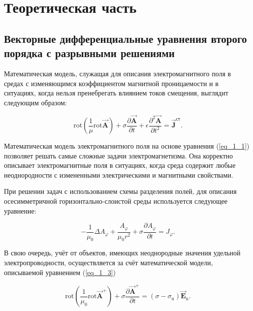 \chapter{Теоретическая часть}

\section{Векторные дифференциальные уравнения второго порядка с разрывными решениями}

Математическая модель, служащая для описания электромагнитного поля в средах с изменяющимся коэффициентом магнитной проницаемости и в ситуациях, когда нельзя пренебрегать влиянием токов смещения, выглядит следующим образом:

\begin{equation} \label{eq_1_1}
	\text{rot} \left( \frac{1}{\mu} \text{rot} \overrightarrow{\textbf{A}} \right) + \sigma \frac{\partial \overrightarrow{\textbf{A}}}{\partial t} + \epsilon \frac{\partial^2 \overrightarrow{\textbf{A}}}{\partial t^2} = \overrightarrow{\textbf{J}}^{\textbf{ст}}.
\end{equation}

Математическая модель электромагнитного поля на основе уравнения (\ref{eq_1_1}) позволяет решать самые сложные задачи электромагнетизма. Она корректно описывает электромагнитные поля в ситуациях, когда среда содержит любые неоднородности с измененными электрическими и магнитными свойствами.

При решении задач с использованием схемы разделения полей, для описания осесимметричной горизонтально-слоистой среды используется следующее уравнение:

\begin{equation*} \label{eq_1_2}
	-\frac{1}{\mu_0} \Delta A_{\varphi} + \frac{A_{\varphi}}{\mu_0 r^2} + \sigma \frac{\partial A_{\varphi}}{\partial t} = J_{\varphi}.
\end{equation*}

В свою очередь, учёт от объектов, имеющих неоднородные значения удельной электропроводности, осуществляется за счёт математической модели, описываемой уравнением (\ref{eq_1_3})

\begin{equation} \label{eq_1_3}
	\text{rot} \left( \frac{1}{\mu_0} \text{rot} \overrightarrow{\textbf{A}}^+ \right) + \sigma \frac{\partial \overrightarrow{\textbf{A}}^+}{\partial t} = \left( \sigma - \sigma_{\text{n}} \right) \overrightarrow{\textbf{E}}_{\text{n}}.
\end{equation}

